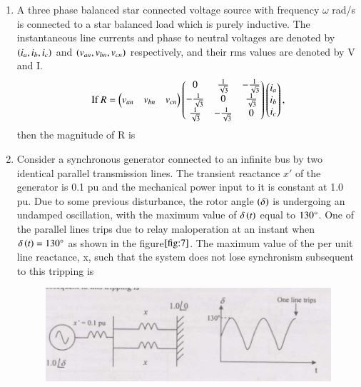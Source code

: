 \documentclass[journal]{IEEEtran}
\numberwithin{equation}{enumi}
\numberwithin{figure}{enumi}
\begin{document}
\begin{enumerate}
\begin{enumerate}
\begin{multicols}{4}
    \end{multicols}
\end{enumerate}
\bigskip
\item A three phase balanced star connected voltage source with frequency $\omega$ rad/s is connected to a star balanced load which is purely inductive. The instantaneous line currents and phase to neutral voltages are denoted by $\left(i_a,i_b,i_c\right)$ and $\left(v_{an},v_{bn},v_{cn}\right)$ respectively, and their rms values are denoted by V and I.
\begin{align*}
    \text{If }R=\begin{pmatrix}v_{an}&v_{bn}&v_{cn}\end{pmatrix}\begin{pmatrix}0&\frac{1}{\sqrt{3}}&-\frac{1}{\sqrt{3}}\\
    -\frac{1}{\sqrt{3}}&0&\frac{1}{\sqrt{3}}\\
    \frac{1}{\sqrt{3}}&-\frac{1}{\sqrt{3}}&0\end{pmatrix}\begin{pmatrix}i_a\\i_b\\i_c\end{pmatrix},
\end{align*}
then the magnitude of R is
\begin{enumerate}
\end{enumerate}
\bigskip
\item Consider a synchronous generator connected to an infinite bus by two identical parallel transmission lines. The transient reactance $x'$ of the generator is 0.1 pu and the mechanical power input to it is constant at 1.0 pu. Due to some previous disturbance, the rotor angle $\left(\delta\right)$ is undergoing an undamped oscillation, with the maximum value of $\delta\left(t\right)$ equal to $130\degree$. One of the parallel lines trips due to relay maloperation at an instant when $\delta\left(t\right)=130\degree$ as shown in the figure$\ref{fig:7}$. The maximum value of the per unit line reactance, x, such that the system does not lose synchronism subsequent to this tripping is
\begin{figure}[!ht]
    \centering
    \includegraphics[width=\linewidth]{figs/7.png}

\end{figure}
\end{enumerate}
\end{document}
